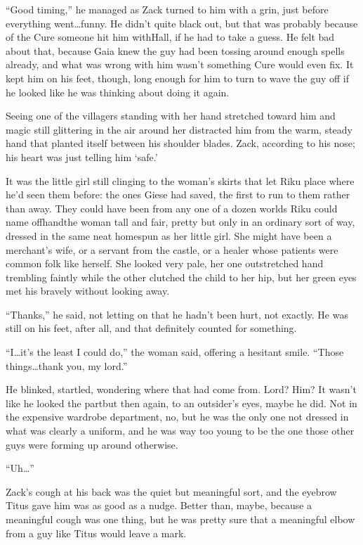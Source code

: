 ``Good timing,'' he managed as Zack turned to him with a grin, just before everything went\ldots funny. He didn't quite black out, but that was probably because of the Cure someone hit him with\textemdash Hall, if he had to take a guess. He felt bad about that, because Gaia knew the guy had been tossing around enough spells already, and what was wrong with him wasn't something Cure would even fix. It kept him on his feet, though, long enough for him to turn to wave the guy off if he looked like he was thinking about doing it again.

Seeing one of the villagers standing with her hand stretched toward him and magic still glittering in the air around her distracted him from the warm, steady hand that planted itself between his shoulder blades. Zack, according to his nose; his heart was just telling him `safe.'

It was the little girl still clinging to the woman's skirts that let Riku place where he'd seen them before: the ones Giese had saved, the first to run to them rather than away. They could have been from any one of a dozen worlds Riku could name offhand\textemdash the woman tall and fair, pretty but only in an ordinary sort of way, dressed in the same neat homespun as her little girl. She might have been a merchant's wife, or a servant from the castle, or a healer whose patients were common folk like herself. She looked very pale, her one outstretched hand trembling faintly while the other clutched the child to her hip, but her green eyes met his bravely without looking away.

``Thanks,'' he said, not letting on that he hadn't been hurt, not exactly. He was still on his feet, after all, and that definitely counted for something.

``I\ldots it's the least I could do,'' the woman said, offering a hesitant smile. ``Those things\ldots thank you, my lord.''

He blinked, startled, wondering where that had come from. Lord? Him? It wasn't like he looked the part\textemdash but then again, to an outsider's eyes, maybe he did. Not in the expensive wardrobe department, no, but he was the only one not dressed in what was clearly a uniform, and he was way too young to be the one those other guys were forming up around otherwise.

``Uh\ldots ''

Zack's cough at his back was the quiet but meaningful sort, and the eyebrow Titus gave him was as good as a nudge. Better than, maybe, because a meaningful cough was one thing, but he was pretty sure that a meaningful elbow from a guy like Titus would leave a mark.

